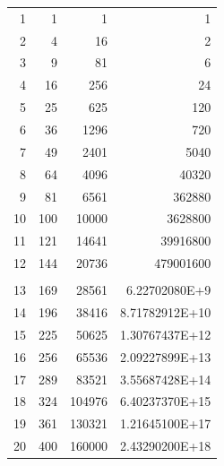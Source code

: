 \documentclass[a4paper]{article}
\begin{document}
\begin{center}
\tablelasttail{\hline}
\par
\begin{supertabular}{| r@{\hspace{6.5mm}}| r@{\hspace{5.5mm}}| r | r|}
1   &     1  &        1  &           1    \\
2   &     4  &       16  &           2    \\
3   &     9  &       81  &           6    \\
4   &    16  &      256  &          24    \\[5mm]
5   &    25  &      625  &         120    \\
6   &    36  &     1296  &         720    \\
7   &    49  &     2401  &        5040    \\
8   &    64  &     4096  &       40320    \\
9   &    81  &     6561  &      362880    \\
10  &   100  &    10000  &     3628800    \\
11  &   121  &    14641  &    39916800    \\
12  &   144  &    20736  &   479001600    \\[.5cm]
\hline & & & \\
13  &   169  &    28561  &  6.22702080E+9 \\[1cm]
14  &   196  &    38416  &  8.71782912E+10\\
15  &   225  &    50625  &  1.30767437E+12\\
16  &   256  &    65536  &  2.09227899E+13\\
17  &   289  &    83521  &  3.55687428E+14\\[5mm]
18  &   324  &   104976  &  6.40237370E+15\\
19  &   361  &   130321  &  1.21645100E+17\\
20  &   400  &   160000  &  2.43290200E+18\\
\end{supertabular}
\end{center}
\end{document}
